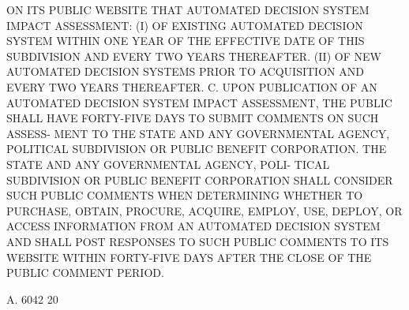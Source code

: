  ON ITS PUBLIC WEBSITE THAT AUTOMATED DECISION SYSTEM IMPACT ASSESSMENT:
   (I)  OF  EXISTING  AUTOMATED  DECISION  SYSTEM  WITHIN ONE YEAR OF THE
 EFFECTIVE DATE OF THIS SUBDIVISION AND EVERY TWO YEARS THEREAFTER.
   (II) OF NEW AUTOMATED DECISION SYSTEMS PRIOR TO ACQUISITION AND  EVERY
 TWO YEARS THEREAFTER.
   C. UPON PUBLICATION OF AN AUTOMATED DECISION SYSTEM IMPACT ASSESSMENT,
 THE PUBLIC SHALL HAVE FORTY-FIVE DAYS TO SUBMIT COMMENTS ON SUCH ASSESS-
 MENT  TO THE STATE AND ANY GOVERNMENTAL AGENCY, POLITICAL SUBDIVISION OR
 PUBLIC BENEFIT CORPORATION. THE STATE AND ANY GOVERNMENTAL AGENCY, POLI-
 TICAL SUBDIVISION OR PUBLIC  BENEFIT  CORPORATION  SHALL  CONSIDER  SUCH
 PUBLIC  COMMENTS  WHEN DETERMINING WHETHER TO PURCHASE, OBTAIN, PROCURE,
 ACQUIRE, EMPLOY, USE, DEPLOY, OR ACCESS INFORMATION  FROM  AN  AUTOMATED
 DECISION  SYSTEM AND SHALL POST RESPONSES TO SUCH PUBLIC COMMENTS TO ITS
 WEBSITE WITHIN FORTY-FIVE DAYS AFTER THE CLOSE  OF  THE  PUBLIC  COMMENT
 PERIOD.

 A. 6042                            20
 
